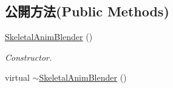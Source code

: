 \subsection*{公開方法(Public Methods)}
\begin{DoxyCompactItemize}
\item 
\hyperlink{class_i_dream_sky_1_1_skeletal_anim_blender_a07ed410db8d39ed10e1f9dbe56e2bb34}{Skeletal\+Anim\+Blender} ()\hypertarget{class_i_dream_sky_1_1_skeletal_anim_blender_a07ed410db8d39ed10e1f9dbe56e2bb34}{}\label{class_i_dream_sky_1_1_skeletal_anim_blender_a07ed410db8d39ed10e1f9dbe56e2bb34}

\begin{DoxyCompactList}\small\item\em Constructor. \end{DoxyCompactList}\item 
virtual \hyperlink{class_i_dream_sky_1_1_skeletal_anim_blender_af425a63f6e5022730bb5497e59d1b150}{$\sim$\+Skeletal\+Anim\+Blender} ()\hypertarget{class_i_dream_sky_1_1_skeletal_anim_blender_af425a63f6e5022730bb5497e59d1b150}{}\label{class_i_dream_sky_1_1_skeletal_anim_blender_af425a63f6e5022730bb5497e59d1b150}


\end{DoxyCompactItemize}
